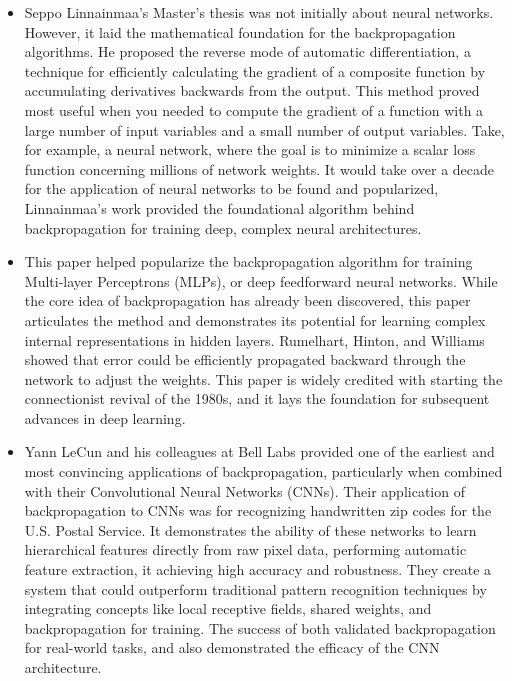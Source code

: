 \begin{itemize}
    \item \textbf{\cite{Linnainmaa1970}}
    Seppo Linnainmaa's Master's thesis was not initially about neural networks. However, it laid the mathematical foundation for the backpropagation algorithms. He proposed the reverse mode of automatic differentiation, a technique for efficiently calculating the gradient of a composite function by accumulating derivatives backwards from the output. This method proved most useful when you needed to compute the gradient of a function with a large number of input variables and a small number of output variables. Take, for example, a neural network, where the goal is to minimize a scalar loss function concerning millions of network weights. It would take over a decade for the application of neural networks to be found and popularized, Linnainmaa's work provided the foundational algorithm behind backpropagation for training deep, complex neural architectures.
    
    \item \textbf{\cite{Rumelhart1985}}
    This paper helped popularize the backpropagation algorithm for training Multi-layer Perceptrons (MLPs), or deep feedforward neural networks. While the core idea of backpropagation has already been discovered, this paper articulates the method and demonstrates its potential for learning complex internal representations in hidden layers. Rumelhart, Hinton, and Williams showed that error could be efficiently propagated backward through the network to adjust the weights. This paper is widely credited with starting the connectionist revival of the 1980s, and it lays the foundation for subsequent advances in deep learning. 
    
    \item \textbf{\cite{LeCun1989b}}
    Yann LeCun and his colleagues at Bell Labs provided one of the earliest and most convincing applications of backpropagation, particularly when combined with their Convolutional Neural Networks (CNNs). Their application of backpropagation to CNNs was for recognizing handwritten zip codes for the U.S. Postal Service. It demonstrates the ability of these networks to learn hierarchical features directly from raw pixel data, performing automatic feature extraction, it achieving high accuracy and robustness. They create a system that could outperform traditional pattern recognition techniques by integrating concepts like local receptive fields, shared weights, and backpropagation for training. The success of both validated backpropagation for real-world tasks, and also demonstrated the efficacy of the CNN architecture. 
    

\end{itemize}
